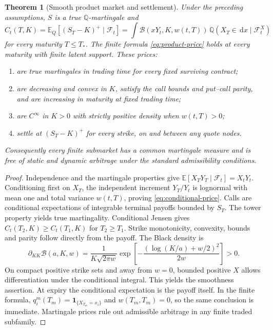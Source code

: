 \documentclass[11pt,a4paper]{article}
\numberwithin{equation}{section}
\newtheorem{theorem}{Theorem}[section]
\theoremstyle{definition}\newtheorem{definition}[theorem]{Definition}
\theoremstyle{remark}\newtheorem{remark}[theorem]{Remark}
\newcommand{\Q}{\mathbb Q}\newcommand{\Pp}{\mathbb P}
\newcommand{\E}{\mathbb E}\newcommand{\R}{\mathbb R}
\newcommand{\F}{\mathcal F}\newcommand{\G}{\mathcal G}
\newcommand{\dd}{\,\mathrm d}\newcommand{\dt}{\,\mathrm dt}
\newcommand{\ind}{\mathbf 1}\newcommand{\diag}{\operatorname{diag}}
\newcommand{\Black}{\mathcal B}\newcommand{\LC}{\mathcal L}
\begin{document}
\begin{theorem}[Smooth product market and settlement]
\label{thm:product}
Under the preceding assumptions, $S$ is a true $\Q$-martingale and
\begin{equation}
 C_t(T,K)=\E_Q[(S_T-K)^+\mid\F_t]
 =\int\Black(xY_t,K,w(t,T))\,\Q(X_T\in\dd x\mid\F_t^X)
 \label{eq:conditional-price}
\end{equation}
for every maturity $T\leq T_*$. The finite formula \eqref{eq:product-price} holds at every maturity with finite latent support. These prices:
\begin{enumerate}[label=(\roman*)]
\item are true martingales in trading time for every fixed surviving contract;
\item are decreasing and convex in $K$, satisfy the call bounds and put--call parity, and are increasing in maturity at fixed trading time;
\item are $C^\infty$ in $K>0$ with strictly positive density when $w(t,T)>0$;
\item settle at $(S_T-K)^+$ for every strike, on and between any quote nodes.
\end{enumerate}
Consequently every finite submarket has a common martingale measure and is free of static and dynamic arbitrage under the standard admissibility conditions.
\end{theorem}
\begin{proof}
Independence and the martingale properties give $\E[X_TY_T\mid\F_t]=X_tY_t$. Conditioning first on $X_T$, the independent increment $Y_T/Y_t$ is lognormal with mean one and total variance $w(t,T)$, proving \eqref{eq:conditional-price}. Calls are conditional expectations of integrable terminal payoffs bounded by $S_T$. The tower property yields true martingality. Conditional Jensen gives $C_t(T_2,K)\geq C_t(T_1,K)$ for $T_2\geq T_1$. Strike monotonicity, convexity, bounds and parity follow directly from the payoff. The Black density is
\begin{equation}
 \partial_{KK}\Black(a,K,w)
 =\frac{1}{K\sqrt{2\pi w}}
   \exp\left[-\frac{(\log(K/a)+w/2)^2}{2w}\right]>0.
 \label{eq:kernel-density}
\end{equation}
On compact positive strike sets and away from $w=0$, bounded positive $X$ allows differentiation under the conditional integral. This yields the smoothness assertion. At expiry the conditional expectation is the payoff itself. In the finite formula, $q_i^m(T_m)=\ind_{\{X_{T_m}=x_i\}}$ and $w(T_m,T_m)=0$, so the same conclusion is immediate. Martingale prices rule out admissible arbitrage in any finite traded subfamily.
\end{proof}
\end{document}
